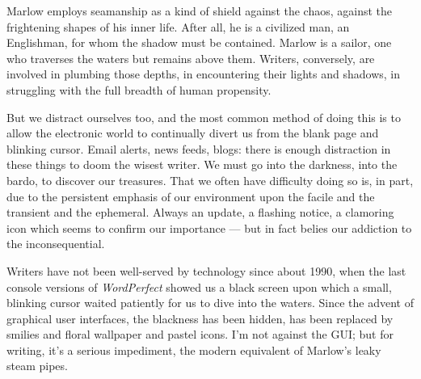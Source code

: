 \documentclass[letterpaper,10pt,headsepline]{scrreprt}
\begin{document}
Marlow employs seamanship as a kind of shield against the chaos,
against the frightening shapes of his inner life. After all, he is a
civilized man, an Englishman, for whom the shadow must be contained.
Marlow is a sailor, one who traverses the waters but remains above
them. Writers, conversely, are involved in plumbing those depths, in
encountering their lights and shadows, in struggling with the full
breadth of human propensity.

But we distract ourselves too, and the most common method of doing
this is to allow the electronic world to continually divert us from
the blank page and blinking cursor. Email alerts, news feeds, blogs:
there is enough distraction in these things to doom the wisest writer.
We must go into the darkness, into the bardo, to discover our
treasures. That we often have difficulty doing so is, in part, due to
the persistent emphasis of our environment upon the facile and the
transient and the ephemeral. Always an update, a flashing notice, a
clamoring icon which seems to confirm our importance --- but in fact
belies our addiction to the inconsequential.

Writers have not been well-served by technology since about 1990, when
the last console versions of \textit{WordPerfect\/} showed us a black
screen upon which a small, blinking cursor waited patiently for us to
dive into the waters. Since the advent of graphical user interfaces,
the blackness has been hidden, has been replaced by smilies and floral
wallpaper and pastel icons. I'm not against the \textsc{GUI}; but for
writing, it's a serious impediment, the modern equivalent of Marlow's
leaky steam pipes.
\end{document}
